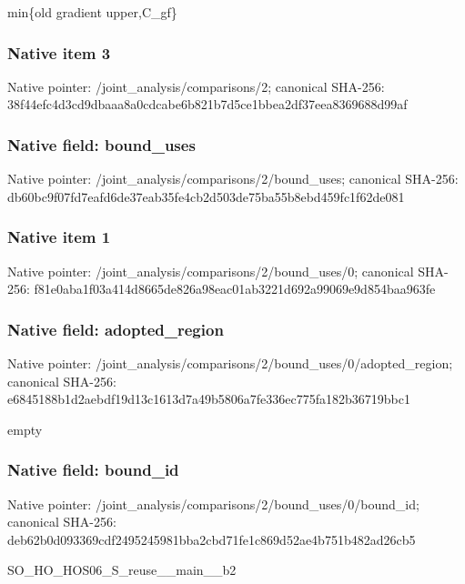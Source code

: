 \documentclass[10pt,a4paper]{article}
\begin{document}
\begingroup\raggedright\sloppy min\{old gradient upper,\allowbreak{}C\_\allowbreak{}gf\}\par\endgroup

\subsubsection{Native item 3}
Native pointer: /joint\_\allowbreak{}analysis/comparisons/2; canonical SHA-256: 38f44efc4d3cd9dbaaa8a0cdcabe6b821b7d5ce1bbea2df37eea8369688d99af

\subsubsection{Native field: bound\_\allowbreak{}uses}
Native pointer: /joint\_\allowbreak{}analysis/comparisons/2/bound\_\allowbreak{}uses; canonical SHA-256: db60bc9f07fd7eafd6de37eab35fe4cb2d503de75ba55b8ebd459fc1f62de081

\subsubsection{Native item 1}
Native pointer: /joint\_\allowbreak{}analysis/comparisons/2/bound\_\allowbreak{}uses/0; canonical SHA-256: f81e0aba1f03a414d8665de826a98eac01ab3221d692a99069e9d854baa963fe

\subsubsection{Native field: adopted\_\allowbreak{}region}
Native pointer: /joint\_\allowbreak{}analysis/comparisons/2/bound\_\allowbreak{}uses/0/adopted\_\allowbreak{}region; canonical SHA-256: e6845188b1d2aebdf19d13c1613d7a49b5806a7fe336ec775fa182b36719bbc1

\begingroup\raggedright\sloppy empty\par\endgroup

\subsubsection{Native field: bound\_\allowbreak{}id}
Native pointer: /joint\_\allowbreak{}analysis/comparisons/2/bound\_\allowbreak{}uses/0/bound\_\allowbreak{}id; canonical SHA-256: deb62b0d093369cdf2495245981bba2cbd71fe1c869d52ae4b751b482ad26cb5

\begingroup\raggedright\sloppy SO\_\allowbreak{}HO\_\allowbreak{}HOS06\_\allowbreak{}S\_\allowbreak{}reuse\_\allowbreak{}\_\allowbreak{}main\_\allowbreak{}\_\allowbreak{}b2\par\endgroup
\end{document}
